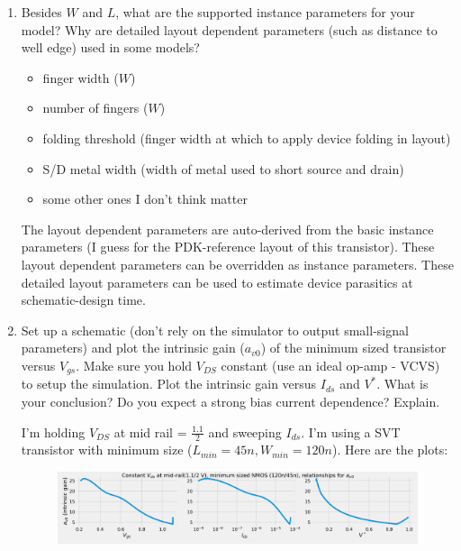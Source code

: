 \begin{enumerate}
\item {\color{blue}Besides $W$ and $L$, what are the supported instance parameters for your model? Why are detailed layout dependent parameters (such as distance to well edge) used in some models?}

    \begin{itemize}
        \item finger width ($W$)
        \item number of fingers ($W$)
        \item folding threshold (finger width at which to apply device folding in layout)
        \item S/D metal width (width of metal used to short source and drain)
        \item some other ones I don't think matter
    \end{itemize}

    The layout dependent parameters are auto-derived from the basic instance parameters (I guess for the PDK-reference layout of this transistor). These layout dependent parameters can be overridden as instance parameters. These detailed layout parameters can be used to estimate device parasitics at schematic-design time.

\item {\color{blue}Set up a schematic (don't rely on the simulator to output small-signal parameters) and plot the intrinsic gain ($a_{v0}$) of the minimum sized transistor versus $V_{gs}$. Make sure you hold $V_{DS}$ constant (use an ideal op-amp - VCVS) to setup the simulation. Plot the intrinsic gain versus $I_{ds}$ and $V^*$. What is your conclusion? Do you expect a strong bias current dependence? Explain.}

    I'm holding $V_{DS}$ at mid rail = $\frac{1.1}{2}$ and sweeping $I_{ds}$. I'm using a SVT transistor with minimum size ($L_{min} = 45n, W_{min} = 120n$). Here are the plots:

    \begin{figure}[H]
        \centering
        \includegraphics[width=\textwidth]{figs/problem4.png}
    \end{figure}


\end{enumerate}
